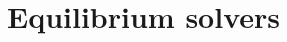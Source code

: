 \part{Equilibrium solvers}\label{part:solvers}
\thispagestyle{empty}

\cleardoublepage{}
\thispagestyle{empty}